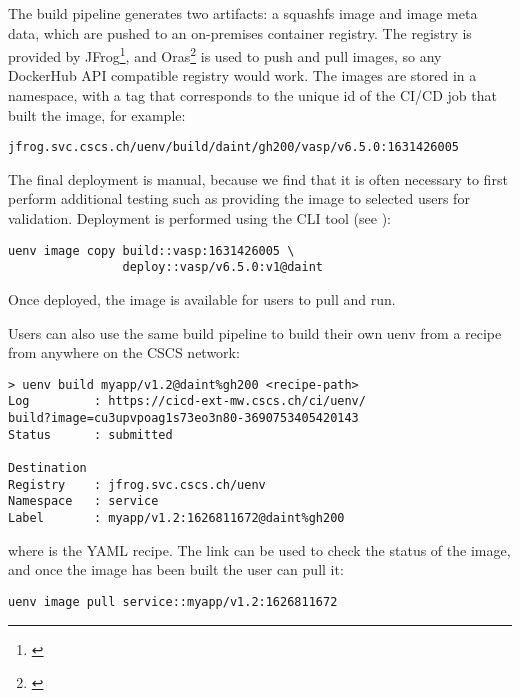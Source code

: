 
The build pipeline generates two artifacts: a squashfs image and image meta data, which are pushed to an on-premises container registry.
The registry is provided by JFrog\footnote{\href{https://jfrog.com}{}}, and Oras\footnote{\href{https://oras.land}{}} is used to push and pull images, so any DockerHub API compatible registry would work.
The images are stored in a  namespace, with a tag that corresponds to the unique id of the CI/CD job that built the image, for example:
\begin{lstlisting}
jfrog.svc.cscs.ch/uenv/build/daint/gh200/vasp/v6.5.0:1631426005
\end{lstlisting}

The final deployment is manual, because we find that it is often necessary to first perform additional testing such as providing the image to selected users for validation.
Deployment is performed using the CLI tool (see ):
\begin{lstlisting}
uenv image copy build::vasp:1631426005 \
                deploy::vasp/v6.5.0:v1@daint
\end{lstlisting}
Once deployed, the image is available for users to pull and run.

Users can also use the same build pipeline to build their own uenv from a recipe from anywhere on the CSCS network:
\begin{lstlisting}
> uenv build myapp/v1.2@daint%gh200 <recipe-path>
Log         : https://cicd-ext-mw.cscs.ch/ci/uenv/
build?image=cu3upvpoag1s73eo3n80-3690753405420143
Status      : submitted

Destination
Registry    : jfrog.svc.cscs.ch/uenv
Namespace   : service
Label       : myapp/v1.2:1626811672@daint%gh200
\end{lstlisting}
where  is the YAML recipe.
The link can be used to check the status of the image, and once the image has been built the user can pull it:
\begin{lstlisting}
uenv image pull service::myapp/v1.2:1626811672
\end{lstlisting}


